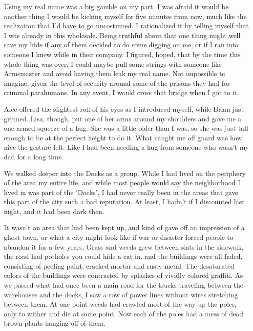 Using my real name was a big gamble on my part.  I was afraid it would be another thing I would be kicking myself for five minutes from now, much like the realization that I'd have to go uncostumed.  I rationalized it by telling myself that I was already in this wholesale.  Being truthful about that one thing might well save my hide if any of them decided to do some digging on me, or if I ran into someone I knew while in their company.  I figured, hoped, that by the time this whole thing was over, I could maybe pull some strings with someone like Armsmaster and avoid having them leak my real name.  Not impossible to imagine, given the level of security around some of the prisons they had for criminal parahumans.  In any event, I would cross that bridge when I got to it.



Alec offered the slightest roll of his eyes as I introduced myself, while Brian just grinned.  Lisa, though, put one of her arms around my shoulders and gave me a one-armed squeeze of a hug.  She was a little older than I was, so she was just tall enough to be at the perfect height to do it.  What caught me off guard was how nice the gesture felt.  Like I had been needing a hug from someone who wasn't my dad for a long time.



We walked deeper into the Docks as a group.  While I had lived on the periphery of the area my entire life, and while most people would say the neighborhood I lived in was part of the `Docks', I had never really been in the areas that gave this part of the city such a bad reputation.  At least, I hadn't if I discounted last night, and it had been dark then.



It wasn't an area that had been kept up, and kind of gave off an impression of a ghost town, or what a city might look like if war or disaster forced people to abandon it for a few years.  Grass and weeds grew between slats in the sidewalk, the road had potholes you could hide a cat in, and the buildings were all faded, consisting of peeling paint, cracked mortar and rusty metal.  The desaturated colors of the buildings were contrasted by splashes of vividly colored graffiti.  As we passed what had once been a main road for the trucks traveling between the warehouses and the docks, I saw a row of power lines without wires stretching between them.  At one point weeds had crawled most of the way up the poles, only to wither and die at some point.  Now each of the poles had a mess of dead brown plants hanging off of them.



